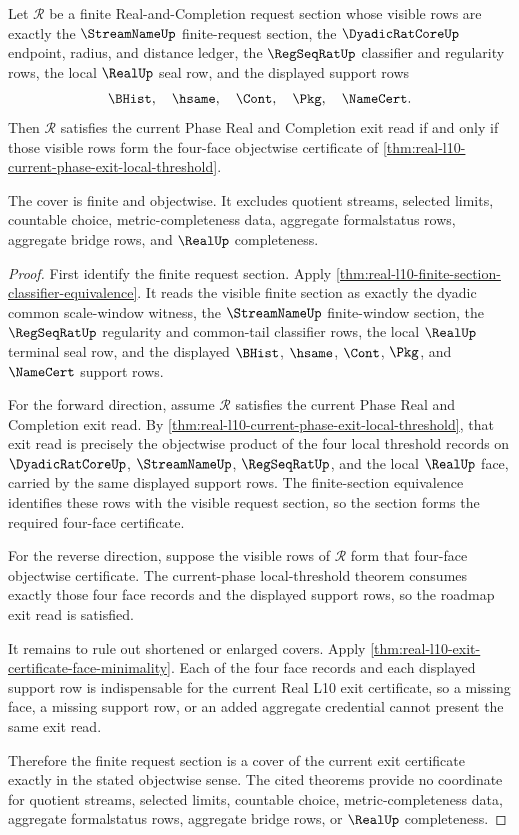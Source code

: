 \begin{theorem}
\label{thm:real-l10-finite-request-exit-cover}
Let $\mathcal R$ be a finite Real-and-Completion request section whose visible rows are exactly the $\StreamNameUp$ finite-request section, the $\DyadicRatCoreUp$ endpoint, radius, and distance ledger, the $\RegSeqRatUp$ classifier and regularity rows, the local $\RealUp$ seal row, and the displayed support rows
$$
\BHist,\quad \hsame,\quad \Cont,\quad \Pkg,\quad \NameCert.
$$
Then $\mathcal R$ satisfies the current Phase Real and Completion exit read if and only if those visible rows form the four-face objectwise certificate of \autoref{thm:real-l10-current-phase-exit-local-threshold}.

The cover is finite and objectwise. It excludes quotient streams, selected limits, countable choice, metric-completeness data, aggregate formalstatus rows, aggregate bridge rows, and $\RealUp$ completeness.
\end{theorem}
\begin{proof}
First identify the finite request section. Apply \autoref{thm:real-l10-finite-section-classifier-equivalence}. It reads the visible finite section as exactly the dyadic common scale-window witness, the $\StreamNameUp$ finite-window section, the $\RegSeqRatUp$ regularity and common-tail classifier rows, the local $\RealUp$ terminal seal row, and the displayed $\BHist$, $\hsame$, $\Cont$, $\Pkg$, and $\NameCert$ support rows.

For the forward direction, assume $\mathcal R$ satisfies the current Phase Real and Completion exit read. By \autoref{thm:real-l10-current-phase-exit-local-threshold}, that exit read is precisely the objectwise product of the four local threshold records on $\DyadicRatCoreUp$, $\StreamNameUp$, $\RegSeqRatUp$, and the local $\RealUp$ face, carried by the same displayed support rows. The finite-section equivalence identifies these rows with the visible request section, so the section forms the required four-face certificate.

For the reverse direction, suppose the visible rows of $\mathcal R$ form that four-face objectwise certificate. The current-phase local-threshold theorem consumes exactly those four face records and the displayed support rows, so the roadmap exit read is satisfied.

It remains to rule out shortened or enlarged covers. Apply \autoref{thm:real-l10-exit-certificate-face-minimality}. Each of the four face records and each displayed support row is indispensable for the current Real L10 exit certificate, so a missing face, a missing support row, or an added aggregate credential cannot present the same exit read.

Therefore the finite request section is a cover of the current exit certificate exactly in the stated objectwise sense. The cited theorems provide no coordinate for quotient streams, selected limits, countable choice, metric-completeness data, aggregate formalstatus rows, aggregate bridge rows, or $\RealUp$ completeness.
\end{proof}

